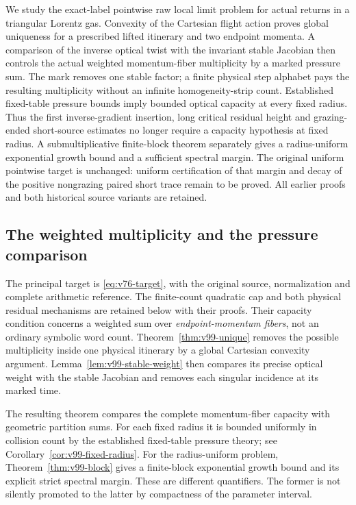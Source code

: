 \documentclass[11pt,reqno]{amsart}
\numberwithin{equation}{section}
\theoremstyle{definition}\newtheorem{definition}[theorem]{Definition}
\theoremstyle{remark}\newtheorem{remark}[theorem]{Remark}
\theoremstyle{definition}\newtheorem{inputstatement}[theorem]{Input statement}
\begin{document}
We study the exact-label pointwise raw local limit problem for actual
returns in a triangular Lorentz gas. Convexity of the Cartesian flight
action proves global uniqueness for a prescribed lifted itinerary and
two endpoint momenta. A comparison of the inverse optical twist with
the invariant stable Jacobian then controls the actual weighted
momentum-fiber multiplicity by a marked pressure sum. The mark removes
one stable factor; a finite physical step alphabet pays the resulting
multiplicity without an infinite homogeneity-strip count. Established
fixed-table pressure bounds imply bounded optical capacity at every
fixed radius. Thus the first inverse-gradient insertion, long critical
residual height and grazing-ended short-source estimates no longer
require a capacity hypothesis at fixed radius. A submultiplicative
finite-block theorem separately gives a radius-uniform exponential
growth bound and a sufficient spectral margin. The original uniform
pointwise target is unchanged: uniform certification of that margin
and decay of the positive nongrazing paired short trace remain to be
proved. All earlier proofs and both historical source variants are
retained.




\subsection{The weighted multiplicity and the pressure comparison}
The principal target is \eqref{eq:v76-target}, with the original source,
normalization and complete arithmetic reference. The finite-count
quadratic cap and both physical residual mechanisms are retained below
with their proofs. Their capacity condition concerns a weighted sum over
\emph{endpoint-momentum fibers}, not an ordinary symbolic word count.
Theorem~\ref{thm:v99-unique} removes the possible multiplicity inside
one physical itinerary by a global Cartesian convexity argument.
Lemma~\ref{lem:v99-stable-weight} then compares its precise optical
weight with the stable Jacobian and removes each singular incidence
at its marked time.

The resulting theorem compares the complete momentum-fiber capacity
with geometric partition sums. For each fixed radius it is bounded
uniformly in collision count by the established fixed-table pressure
theory; see Corollary~\ref{cor:v99-fixed-radius}. For the radius-uniform
problem, Theorem~\ref{thm:v99-block} gives a finite-block exponential
growth bound and its explicit strict spectral margin. These are
different quantifiers. The former is not silently promoted to the
latter by compactness of the parameter interval.
\end{document}
